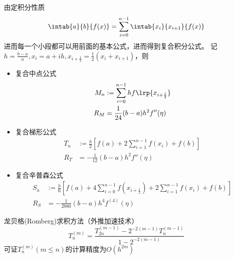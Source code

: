 由定积分性质
\[\intab{a}{b}{f(x)}=\sum_{i=0}^{n-1}\intab{x_i}{x_{i+1}}{f(x)}\]
进而每一个小段都可以用前面的基本公式，进而得到复合积分公式。
记$h=\frac{b-a}{n},x_i=a+ih,x_{i+\frac{1}{2}}=\frac{1}{2}(x_i+x_{i+1})$，则
\begin{itemize}
\item 复合中点公式
\[\begin{aligned}
    M_n&:=\sum_{i=0}^{n-1}hf\lrp{x_{i+\frac{1}{2}}}\\
    R_M&=\frac{1}{24}(b-a)h^2f''(\eta)
\end{aligned}\]
\item 复合梯形公式
\[\begin{aligned}
    T_n&:=\frac{h}{2}\left[f(a)+2\sum_{i=1}^{n-1}f(x_i)+f(b)\right]\\
    R_T&=-\frac{1}{12}(b-a)h^2f''(\eta)
\end{aligned}\]
\item 复合辛普森公式
\[\begin{aligned}
    S_n&:=\frac{h}{6}\left[f(a)+4\sum_{i=0}^{n-1}f(x_{i+\frac{1}{2}})+2\sum_{i=1}^{n-1}f(x_i)+f(b)\right]\\
    R_S&=-\frac{1}{2880}(b-a)h^4f^{(4)}(\eta)
\end{aligned}\]
\end{itemize}

龙贝格(Romberg)求积方法（外推加速技术）
\[T_n^{(m)}=\frac{T_{2n}^{(m-1)}-2^{-2(m-1)}T_n^{(m-1)}}{1-2^{-2(m-1)}}\]
可证$T_n^{(m)}(m\leq n)$的计算精度为$O(h^{2m})$

